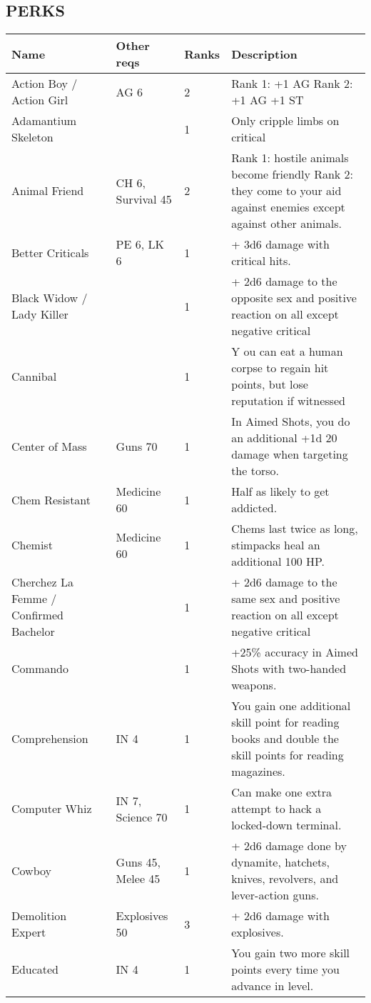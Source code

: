 
\subsection{PERKS}
\begin{longtable}{|p{3.3cm}|p{3.1cm}|p{1.2cm}|p{8.4cm}|}
\hline
\bfseries Name & \bfseries Other reqs & \bfseries Ranks & \bfseries Description \\
\hline
\endhead

Action Boy / Action Girl & AG 6 & 2 & Rank 1: +1 AG Rank 2: +1 AG +1 ST \\
Adamantium Skeleton & & 1 & Only cripple limbs on critical \\
Animal Friend & CH 6, Survival 45 & 2 & Rank 1: hostile animals become friendly Rank 2: they come to your aid against enemies except against other animals. \\
Better Criticals & PE 6, LK 6 & 1 & + 3d6 damage with critical hits. \\
Black Widow / Lady Killer & & 1 & + 2d6 damage to the opposite sex and positive reaction on all except negative critical \\
Cannibal & & 1 & Y ou can eat a human corpse to regain hit points, but lose reputation if witnessed \\
Center of Mass & Guns 70 & 1 & In Aimed Shots, you do an additional +1d 20 damage when targeting the torso. \\
Chem Resistant & Medicine 60 & 1 & Half as likely to get addicted. \\
Chemist & Medicine 60 & 1 & Chems last twice as long, stimpacks heal an additional 100 HP. \\
Cherchez La Femme / Confirmed Bachelor & & 1 & + 2d6 damage to the same sex and positive reaction on all except negative critical \\
Commando & & 1 & +25\% accuracy in Aimed Shots with two-handed weapons. \\
Comprehension & IN 4 & 1 & You gain one additional skill point for reading books and double the skill points for reading magazines. \\
Computer Whiz & IN 7, Science 70 & 1 & Can make one extra attempt to hack a locked-down terminal. \\
Cowboy & Guns 45, Melee 45 & 1 & + 2d6 damage done by dynamite, hatchets, knives, revolvers, and lever-action guns. \\
Demolition Expert & Explosives 50 & 3 & + 2d6 damage with explosives. \\
Educated & IN 4 & 1 & You gain two more skill points every time you advance in level. \\

\end{longtable}
